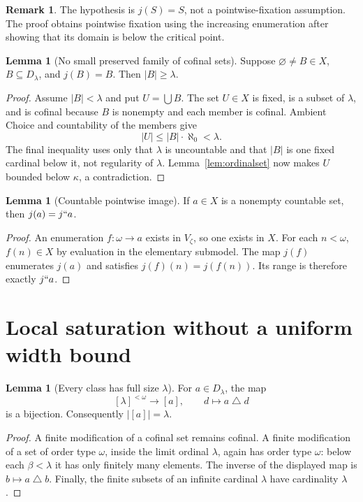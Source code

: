\documentclass[11pt,letterpaper]{article}
\theoremstyle{definition}
\newtheorem{lemma}[definition]{Lemma}
\newtheorem{remark}[definition]{Remark}
\numberwithin{equation}{section}
\newcommand{\symdiff}{\mathbin{\triangle}}
\begin{document}
\begin{remark}
The hypothesis is $j(S)=S$, not a pointwise-fixation assumption. The proof obtains pointwise fixation using the increasing enumeration after showing that its domain is below the critical point.
\end{remark}

\begin{lemma}[No small preserved family of cofinal sets]\label{lem:cofinalfamily}
Suppose $\varnothing\ne B\in X$, $B\subseteq D_\lambda$, and $j(B)=B$. Then $|B|\ge\lambda$.
\end{lemma}

\begin{proof}
Assume $|B|<\lambda$ and put $U=\bigcup B$. The set $U\in X$ is fixed, is a subset of $\lambda$, and is cofinal because $B$ is nonempty and each member is cofinal. Ambient Choice and countability of the members give
\[
        |U|\le |B|\cdot\aleph_0<\lambda.
\]
The final inequality uses only that $\lambda$ is uncountable and that $|B|$ is one fixed cardinal below it, not regularity of $\lambda$. Lemma~\ref{lem:ordinalset} now makes $U$ bounded below $\kappa$, a contradiction.
\end{proof}

\begin{lemma}[Countable pointwise image]\label{lem:countable}
If $a\in X$ is a nonempty countable set, then $j(a)=j``a$.
\end{lemma}

\begin{proof}
An enumeration $f:\omega\to a$ exists in $V_\zeta$, so one exists in $X$. For each $n<\omega$, $f(n)\in X$ by evaluation in the elementary submodel. The map $j(f)$ enumerates $j(a)$ and satisfies $j(f)(n)=j(f(n))$. Its range is therefore exactly $j``a$.
\end{proof}

\section{Local saturation without a uniform width bound}\label{sec:local}

\begin{lemma}[Every class has full size $\lambda$]\label{lem:classsize}
For $a\in D_\lambda$, the map
\[
 [\lambda]^{<\omega}\longrightarrow[a],\qquad d\longmapsto a\symdiff d
\]
is a bijection. Consequently $|[a]|=\lambda$.
\end{lemma}

\begin{proof}
A finite modification of a cofinal set remains cofinal. A finite modification of a set of order type $\omega$, inside the limit ordinal $\lambda$, again has order type $\omega$: below each $\beta<\lambda$ it has only finitely many elements. The inverse of the displayed map is $b\mapsto a\symdiff b$. Finally, the finite subsets of an infinite cardinal $\lambda$ have cardinality $\lambda$.
\end{proof}
\end{document}
